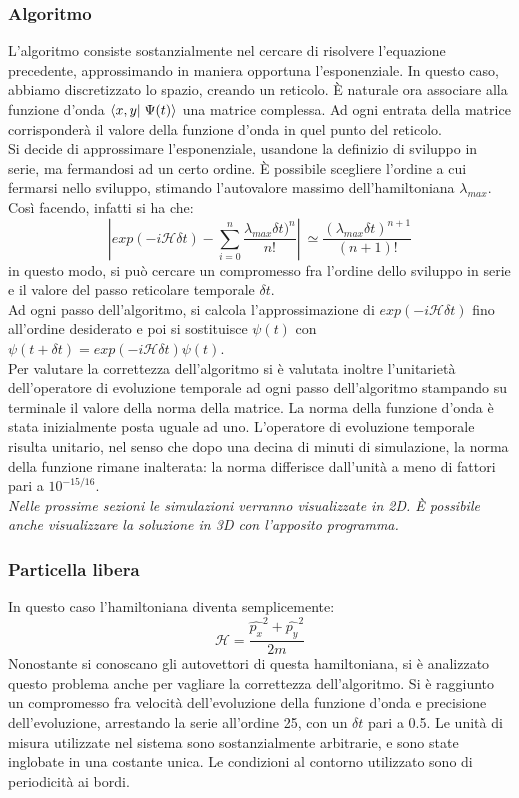 \subsubsection{Algoritmo}
L'algoritmo consiste sostanzialmente nel cercare di risolvere l'equazione precedente, approssimando in maniera opportuna l'esponenziale.
In questo caso, abbiamo discretizzato lo spazio, creando un reticolo. È naturale ora associare alla funzione d'onda $ \braket{x,y}{\Psi(t)}$ una
matrice complessa. Ad ogni entrata della matrice corrisponderà il valore della funzione d'onda in quel punto del reticolo.\\
Si decide di approssimare l'esponenziale, usandone la definizio di sviluppo in serie, ma fermandosi ad un certo ordine. È possibile scegliere l'ordine a cui fermarsi nello sviluppo,
stimando l'autovalore massimo dell'hamiltoniana $ \lambda_{max}$. Così facendo, infatti si ha che:
$$
\left| exp \left( - i \mathcal{H} \delta t \right) - \sum_{i=0}^n \frac{\lambda_{max} \delta t)^{n}}{n!} \right| \ \simeq \frac{\left(\lambda_{max} \delta t\right)^{n+1}}{(n+1)!} 
$$
in questo modo, si può cercare un compromesso fra l'ordine dello sviluppo in serie e il valore del passo reticolare temporale $\delta t$.\\
Ad ogni passo dell'algoritmo, si calcola l'approssimazione di $ exp \left( -i \mathcal{H} \delta t \right)$ fino all'ordine desiderato e poi si
sostituisce $ \psi(t)$ con $\psi(t+\delta t) = exp \left( -i \mathcal{H} \delta t \right) \psi(t)$.\\
Per valutare la correttezza dell'algoritmo si è valutata inoltre l'unitarietà dell'operatore di evoluzione temporale ad ogni passo dell'algoritmo stampando su terminale il valore della norma
della matrice. La norma della funzione d'onda è stata inizialmente posta uguale ad uno. L'operatore di evoluzione temporale risulta unitario, nel senso che dopo una decina di minuti di simulazione,
la norma della funzione rimane inalterata: la norma differisce dall'unità a meno di fattori pari a $10^{-15/16}$.\\

\emph{Nelle prossime sezioni le simulazioni verranno visualizzate in 2D. È possibile anche visualizzare la soluzione in 3D con l'apposito programma.}
\subsubsection{Particella libera}
In questo caso l'hamiltoniana diventa semplicemente:
$$
\mathcal{H} = \frac{\hat{p_x}^2+\hat{p_y}^2}{2m}
$$
Nonostante si conoscano gli autovettori di questa hamiltoniana, si è analizzato questo problema anche per vagliare la correttezza dell'algoritmo.
Si è raggiunto un compromesso fra velocità dell'evoluzione della funzione d'onda e precisione dell'evoluzione, arrestando la serie all'ordine 25, con un $\delta t$ pari a 0.5.
Le unità di misura utilizzate nel sistema sono sostanzialmente arbitrarie, e sono state inglobate in una costante unica.
Le condizioni al contorno utilizzato sono di periodicità ai bordi.\\


